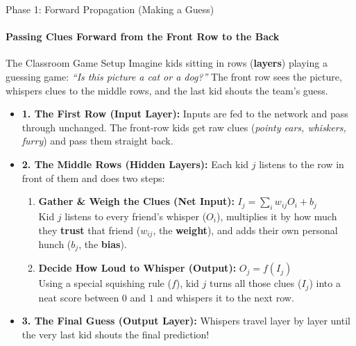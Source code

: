 \documentclass[aspectratio=169]{beamer}
\begin{document}
\begin{frame}{Phase 1: Forward Propagation (Making a Guess)}
\framesubtitle{Passing Clues Forward from the Front Row to the Back}

\begin{block}{The Classroom Game Setup}
    \scriptsize
    Imagine kids sitting in rows (\textbf{layers}) playing a guessing game: \textit{``Is this picture a cat or a dog?''} The front row sees the picture, whispers clues to the middle rows, and the last kid shouts the team's guess.
\end{block}

\begin{itemize}
    \scriptsize
    \item \textbf{1. The First Row (Input Layer):}
    Inputs are fed to the network and pass through unchanged. The front-row kids get raw clues (\textit{pointy ears, whiskers, furry}) and pass them straight back.

    \item \textbf{2. The Middle Rows (Hidden Layers):}
    Each kid $j$ listens to the row in front of them and does two steps:
    \begin{enumerate}
        \scriptsize
        \item \textbf{Gather \& Weigh the Clues (Net Input):}
        $I_j = \sum_i w_{ij} O_i + b_j$ \\
        Kid $j$ listens to every friend's whisper ($O_i$), multiplies it by how much they \textbf{trust} that friend ($w_{ij}$, the \textbf{weight}), and adds their own personal hunch ($b_j$, the \textbf{bias}).
        \item \textbf{Decide How Loud to Whisper (Output):}
        $O_j = f(I_j)$ \\
        Using a special squishing rule ($f$), kid $j$ turns all those clues ($I_j$) into a neat score between $0$ and $1$ and whispers it to the next row.
    \end{enumerate}

    \item \textbf{3. The Final Guess (Output Layer):}
    Whispers travel layer by layer until the very last kid shouts the final prediction!
\end{itemize}
\end{frame}
\end{document}

